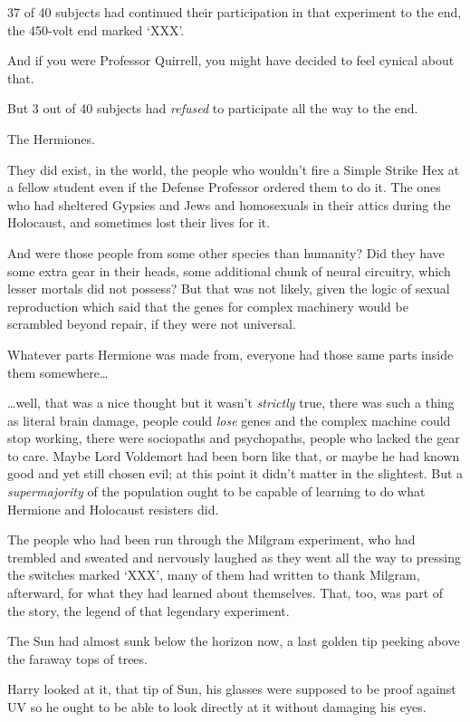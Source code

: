 37 of 40 subjects had continued their participation in that experiment to the 
end, the 450-volt end marked `XXX'.

And if you were Professor Quirrell, you might have decided to feel cynical 
about that.

But 3 out of 40 subjects had \emph{refused} to participate all the way to the 
end.

The Hermiones.

They did exist, in the world, the people who wouldn't fire a Simple Strike Hex 
at a fellow student even if the Defense Professor ordered them to do it. The 
ones who had sheltered Gypsies and Jews and homosexuals in their attics during 
the Holocaust, and sometimes lost their lives for it.

And were those people from some other species than humanity? Did they have some 
extra gear in their heads, some additional chunk of neural circuitry, which 
lesser mortals did not possess? But that was not likely, given the logic of 
sexual reproduction which said that the genes for complex machinery would be 
scrambled beyond repair, if they were not universal.

Whatever parts Hermione was made from, everyone had those same parts inside 
them somewhere{\ldots}

{\ldots}well, that was a nice thought but it wasn't \emph{strictly} true, there 
was such a thing as literal brain damage, people could \emph{lose} genes and 
the complex machine could stop working, there were sociopaths and psychopaths, 
people who lacked the gear to care. Maybe Lord Voldemort had been born like 
that, or maybe he had known good and yet still chosen evil; at this point it 
didn't matter in the slightest. But a \emph{supermajority} of the population 
ought to be capable of learning to do what Hermione and Holocaust resisters did.

The people who had been run through the Milgram experiment, who had trembled 
and sweated and nervously laughed as they went all the way to pressing the 
switches marked `XXX', many of them had written to thank Milgram, afterward, 
for what they had learned about themselves. That, too, was part of the story, 
the legend of that legendary experiment.

The Sun had almost sunk below the horizon now, a last golden tip peeking above 
the faraway tops of trees.

Harry looked at it, that tip of Sun, his glasses were supposed to be proof 
against UV so he ought to be able to look directly at it without damaging his 
eyes.


